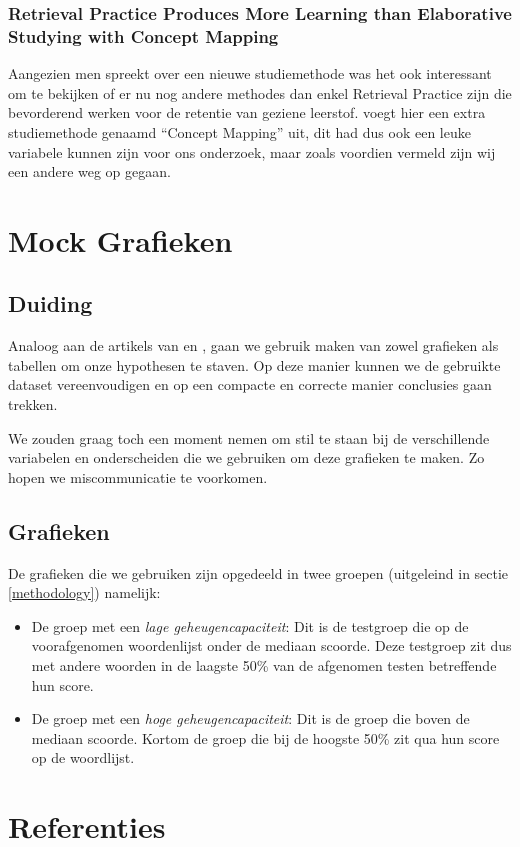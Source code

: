 \documentclass[12pt,a4paper]{article}
\begin{document}
        \subsubsection{Retrieval Practice Produces More Learning than Elaborative Studying with Concept Mapping}
        
        Aangezien men spreekt over een nieuwe studiemethode was het ook interessant om te bekijken of er nu nog andere methodes dan enkel Retrieval Practice zijn die bevorderend werken voor de retentie van geziene leerstof. \cite{JeffreyKarpicke2011} voegt hier een extra studiemethode genaamd ``Concept Mapping'' uit, dit had dus ook een leuke variabele kunnen zijn voor ons onderzoek, maar zoals voordien vermeld zijn wij een andere weg op gegaan.
    
    \newpage
    \section{Mock Grafieken}
    
    	\subsection{Duiding}
    	
    	Analoog aan de artikels van \cite{HenryRoediger2006} en \cite{Agarwal2008}, gaan we gebruik maken van zowel grafieken als tabellen om onze hypothesen te staven. Op deze manier kunnen we de gebruikte dataset vereenvoudigen en op een compacte en correcte manier conclusies gaan trekken.\\
    	\par
    	\noindent
    	We zouden graag toch een moment nemen om stil te staan bij de verschillende variabelen en onderscheiden die we gebruiken om deze grafieken te maken. Zo hopen we miscommunicatie te voorkomen.
    	
    	\subsection{Grafieken}
    	
    	De grafieken die we gebruiken zijn opgedeeld in twee groepen (uitgeleind in sectie \ref{methodology}) namelijk:
    	\begin{itemize}
    		\item De groep met een \textit{lage geheugencapaciteit}: Dit is de testgroep die op de voorafgenomen woordenlijst onder de mediaan scoorde. Deze testgroep zit dus met andere woorden in de laagste 50\% van de afgenomen testen betreffende hun score.
    		\item De groep met een \textit{hoge geheugencapaciteit}: Dit is de groep die boven de mediaan scoorde. Kortom de groep die bij de hoogste 50\% zit qua hun score op de woordlijst.
    	\end{itemize}
    \newpage
    \section{Referenties}
    
	\printbibliography
    
\end{document}
